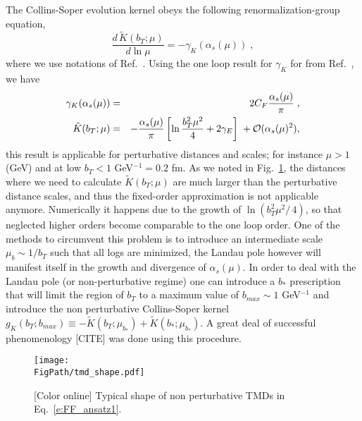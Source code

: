 \documentclass[final,3p,times,onecolumn,sort&compress,hidelinks]{elsarticle}
\newcommand*{\FigPath}{../Figs/}%
\begin{document}
  
The Collins-Soper evolution kernel obeys the following renormalization-group equation,
\begin{equation}
\frac{d\, \tilde K (b_T;\mu)}{d \ln \mu} = - \gamma_K (\alpha_s(\mu)) \; ,
\end{equation} 
where we use notations of Ref.~\cite{Collins:2011zzd}. Using the one loop result for $\gamma_K$ for from Ref.~\cite{Aybat:2011zv}, we have
\begin{eqnarray}
\gamma_K(\alpha_s(\mu)) &=& 2 C_F \frac{\alpha_s(\mu)}{\pi} \; ,\\
\tilde K (b_T;\mu) &=& -\frac{\alpha_s(\mu)}{\pi}  \left[\ln\frac{b_T^2 \mu^2}{4} + 2 \gamma_E
 \right] \; + {\cal O} (\alpha_s(\mu)^2),
 \label{e:CS_kernel}
\end{eqnarray}
this result is applicable for perturbative distances and scales; for instance $\mu > 1$ (GeV) and at low $b_T < 1$  GeV$^{-1} = 0.2$ fm. As we  noted in Fig.~\ref{Fig:tmd_shape},   the distances where we need to calculate $\tilde K (b_T;\mu)$ are much larger than the perturbative distance scales, and thus the fixed-order approximation is not applicable  anymore.  Numerically it happens due to the growth of $\ln\left(b_T^2 \mu^2/\, 4 \right) $, so that neglected higher orders become comparable to the  one loop order. One of the methods to circumvent this problem is to introduce an intermediate scale $\mu_b \sim 1/b_T$ such that all logs are minimized, the Landau pole however will manifest itself in the growth and divergence of $\alpha_s(\mu)$. In order to deal with the Landau pole (or non-perturbative regime) one can introduce a $b_*$ prescription~\cite{Collins:2011zzd} that will limit the region of $b_T$ to a maximum value of $b_{max} \sim 1$ GeV$^{-1}$ and introduce the non perturbative Collins-Soper kernel $g_K(b_T; b_{max}) \equiv - \tilde K(b_T; \mu_{b_*}) + \tilde K(b_*; \mu_{b_*})$. A great deal of successful phenomenology [CITE] was done using this procedure.



\begin{figure}[htb!]
\centering
\texttt{[image: \\FigPath/tmd\_shape.pdf]}
\caption{\label{Fig:tmd_shape}
[Color online] Typical shape of non perturbative TMDs in Eq.~\eqref{e:FF_ansatz1}.
}
\end{figure}
\end{document}
